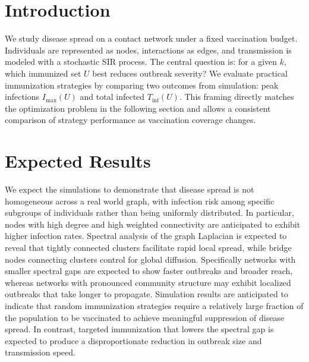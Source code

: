 \documentclass[9pt,twocolumn]{pnas-new}
\makeatletter
\renewcommand{\abscontent}{
\noindent{\absfont \theabstract\par}
\vskip10pt
\noindent{\keywordsfont \@ifundefined{@keywords}{}{\@keywords}\par}
\vskip12pt
}
\makeatother
\begin{document}

\maketitle
\thispagestyle{firststyle}
\ifthenelse{\boolean{shortarticle}}{\ifthenelse{\boolean{singlecolumn}}{\abscontentformatted}{\abscontent}}{}
\section*{Introduction}
We study disease spread on a contact network under a fixed vaccination budget. Individuals are represented as nodes, interactions as edges, and transmission is modeled with a stochastic SIR process. The central question is: for a given $k$, which immunized set $U$ best reduces outbreak severity? We evaluate practical immunization strategies by comparing two outcomes from simulation: peak infections $I_{\max}(U)$ and total infected $T_{\mathrm{inf}}(U)$. This framing directly matches the optimization problem in the following section and allows a consistent comparison of strategy performance as vaccination coverage changes.

\section*{Expected Results}
We expect the simulations to demonstrate that disease spread is not homogeneous across a real world graph, with infection risk among specific subgroups of individuals rather than being uniformly distributed. In particular, nodes with high degree and high weighted connectivity are anticipated to exhibit higher infection rates. Spectral analysis of the graph Laplacian is expected to reveal that tightly connected clusters facilitate rapid local spread, while bridge nodes connecting clusters control for global diffusion. Specifically networks with smaller spectral gaps are expected to show faster outbreaks and broader reach, whereas networks with pronounced community structure may exhibit localized outbreaks that take longer to propagate. Simulation results are anticipated to indicate that random immunization strategies require a relatively large fraction of the population to be vaccinated to achieve meaningful suppression of disease spread. In contrast, targeted immunization that lowers the spectral gap is expected to produce a disproportionate reduction in outbreak size and transmission speed.
\end{document}
